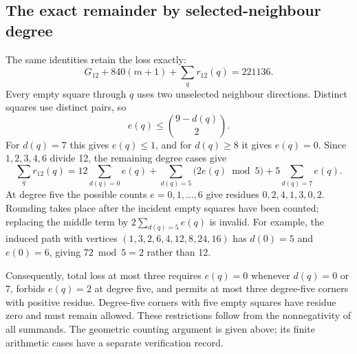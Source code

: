 \documentclass[11pt,a4paper]{article}
\theoremstyle{definition}
\theoremstyle{remark}
\begin{document}
\subsection{The exact remainder by selected-neighbour degree}
The same identities retain the loss exactly:
\begin{equation}\label{eq:exact-loss-budget}
G_{12}+840(m+1)+\sum_q r_{12}(q)=221136.
\end{equation}
Every empty square through $q$ uses two unselected neighbour directions.
Distinct squares use distinct pairs, so
\[
e(q)\le\binom{9-d(q)}2.
\]
For $d(q)=7$ this gives $e(q)\le1$, and for $d(q)\ge8$ it gives $e(q)=0$.
Since $1,2,3,4,6$ divide 12, the remaining degree cases give
\begin{equation}\label{eq:degree-loss}
\sum_q r_{12}(q)
=12\sum_{d(q)=0}e(q)
+\sum_{d(q)=5}\bigl(2e(q)\bmod5\bigr)
+5\sum_{d(q)=7}e(q).
\end{equation}
At degree five the possible counts $e=0,1,\ldots,6$ give residues
$0,2,4,1,3,0,2$. Rounding takes place after the incident empty squares
have been counted; replacing the middle term by $2\sum_{d(q)=5}e(q)$
is invalid. For example, the induced path with vertices
$(1,3,2,6,4,12,8,24,16)$ has $d(0)=5$ and $e(0)=6$, giving
$72\bmod5=2$ rather than 12.

Consequently, total loss at most three requires $e(q)=0$ whenever
$d(q)=0$ or $7$, forbids $e(q)=2$ at degree five, and permits at most
three degree-five corners with positive residue. Degree-five corners
with five empty squares have residue zero and must remain allowed.
These restrictions follow from the nonnegativity of all summands.
The geometric counting argument is given above; its finite arithmetic
cases have a separate verification record.
\end{document}
